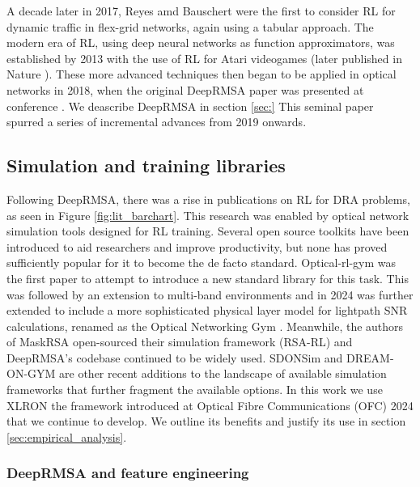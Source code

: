 A decade later in 2017, Reyes amd Bauschert \cite{reyes_adaptive_2017} were the first to consider RL for dynamic traffic in flex-grid networks, again using a tabular approach. The modern era of RL, using deep neural networks as function approximators, was established by 2013 with the use of RL for Atari videogames (later published in Nature \cite{mnih_human-level_2015}). These more advanced techniques then began to be applied in optical networks in 2018, when the original DeepRMSA paper was presented at conference \cite{chen_deep-rmsa_2018}. We deascribe DeepRMSA in section \ref{sec:} This seminal paper spurred a series of incremental advances from 2019 onwards.




\subsection{Simulation and training libraries}
\label{sec:simulation_libraries}
Following DeepRMSA, there was a rise in publications on RL for DRA problems, as seen in Figure \ref{fig:lit_barchart}. This research was enabled by optical network simulation tools designed for RL training. Several open source toolkits have been introduced to aid researchers and improve productivity, but none has proved sufficiently popular for it to become the de facto standard. Optical-rl-gym \cite{natalino_optical_2020} was the first paper to attempt to introduce a new standard library for this task. This was followed by an extension to multi-band environments \cite{morales_multi-band_2021} and in 2024 was further extended to include a more sophisticated physical layer model for lightpath SNR calculations, renamed as the Optical Networking Gym \cite{natalino_optical_2024}. Meanwhile, the authors of MaskRSA open-sourced their simulation framework (RSA-RL) and DeepRMSA's codebase continued to be widely used. SDONSim \cite{mccann_sdonsim_2024} and DREAM-ON-GYM \cite{jara_dream-gym_2024} are other recent additions to the landscape of available simulation frameworks that further fragment the available options. In this work we use XLRON \cite{doherty_xlron_2023} the framework introduced at Optical Fibre Communications (OFC) 2024 that we continue to develop. We outline its benefits and justify its use in section \ref{sec:empirical_analysis}.



\subsubsection{DeepRMSA and feature engineering}
\label{sec:survey-deeprmsa}

